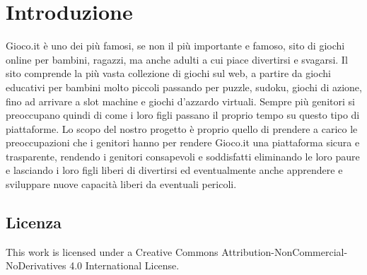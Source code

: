 \documentclass[../Report.tex]{subfiles}
\begin{document}
    \chapter{Introduzione}
    Gioco.it è uno dei più famosi, se non il più importante e famoso, sito di giochi online per bambini, ragazzi, ma anche adulti a cui piace divertirsi e svagarsi. Il sito comprende la più vasta collezione di giochi sul web, a partire da giochi educativi per bambini molto piccoli passando per puzzle, sudoku, giochi di azione, fino ad arrivare a slot machine e giochi d'azzardo virtuali. Sempre più genitori si preoccupano quindi di come i loro figli passano il proprio tempo su questo tipo di piattaforme. Lo scopo del nostro progetto è proprio quello di prendere a carico le preoccupazioni che i genitori hanno per rendere Gioco.it una piattaforma sicura e trasparente, rendendo i genitori consapevoli e soddisfatti eliminando le loro paure e lasciando i loro figli liberi di divertirsi ed eventualmente anche apprendere e sviluppare nuove capacità liberi da eventuali pericoli. 
    \section{Licenza}
    This work is licensed under a Creative Commons Attribution-NonCommercial-NoDerivatives 4.0 International License.
\end{document}
